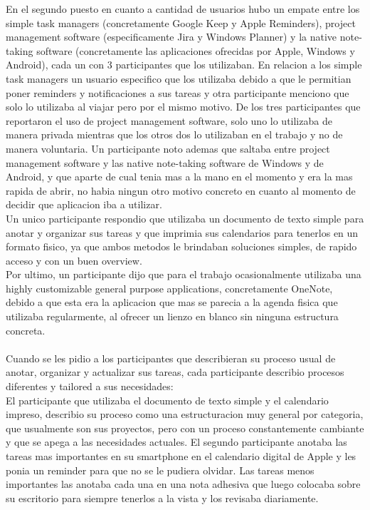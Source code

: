 En el segundo puesto en cuanto a cantidad de usuarios hubo un empate entre los simple task managers (concretamente Google Keep y Apple Reminders), project management software (especificamente Jira y Windows Planner) y la native note-taking software (concretamente las aplicaciones ofrecidas por Apple, Windows y Android), cada un con 3 participantes que los utilizaban. En relacion a los simple task managers un usuario especifico que los utilizaba debido a que le permitian poner reminders y notificaciones a sus tareas y otra participante menciono que solo lo utilizaba al viajar pero por el mismo motivo. De los tres participantes que reportaron el uso de project management software, solo uno lo utilizaba de manera privada mientras que los otros dos lo utilizaban en el trabajo y no de manera voluntaria. Un participante noto ademas que saltaba entre project management software y las native note-taking software de Windows y de Android, y que aparte de cual tenia mas a la mano en el momento y era la mas rapida de abrir, no habia ningun otro motivo concreto en cuanto al momento de decidir que aplicacion iba a utilizar. \\
Un unico participante respondio que utilizaba un documento de texto simple para anotar y organizar sus tareas y que imprimia sus calendarios para tenerlos en un formato fisico, ya que ambos metodos le brindaban soluciones simples, de rapido acceso y con un buen overview.\\
Por ultimo, un participante dijo que para el trabajo ocasionalmente utilizaba una highly customizable general purpose applications, concretamente OneNote, debido a que esta era la aplicacion que mas se parecia a la agenda fisica que utilizaba regularmente, al ofrecer un lienzo en blanco sin ninguna estructura concreta.
\\
\\
Cuando se les pidio a los participantes que describieran su proceso usual de anotar, organizar y actualizar sus tareas, cada participante describio procesos diferentes y tailored a sus necesidades:\\
El participante que utilizaba el documento de texto simple y el calendario impreso, describio su proceso como una estructuracion muy general por categoria, que usualmente son sus proyectos, pero con un proceso constantemente cambiante y que se apega a las necesidades actuales.
El segundo participante anotaba las tareas mas importantes en su smartphone en el calendario digital de Apple y les ponia un reminder para que no se le pudiera olvidar. Las tareas menos importantes las anotaba cada una en una nota adhesiva que luego colocaba sobre su escritorio para siempre tenerlos a la vista y los revisaba diariamente.\\
